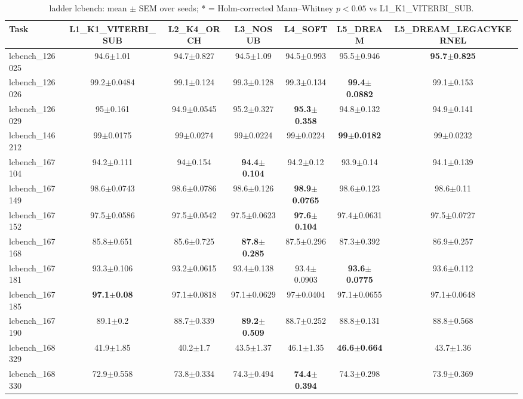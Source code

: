 \begin{table}[t]
\caption{ladder lcbench: mean $\pm$ SEM over seeds; * = Holm-corrected Mann--Whitney $p<0.05$ vs L1_K1_VITERBI_SUB.}
\label{tab:ladder_lcbench}
\begin{center}\small
\begin{tabular}{lcccccc}
\hline
Task & L1\_K1\_VITERBI\_SUB & L2\_K4\_ORCH & L3\_NOSUB & L4\_SOFT & L5\_DREAM & L5\_DREAM\_LEGACYKERNEL \\
\hline
lcbench\_126025 & 94.6$\pm$1.01 & 94.7$\pm$0.827 & 94.5$\pm$1.09 & 94.5$\pm$0.993 & 95.5$\pm$0.946 & \textbf{95.7$\pm$0.825} \\
lcbench\_126026 & 99.2$\pm$0.0484 & 99.1$\pm$0.124 & 99.3$\pm$0.128 & 99.3$\pm$0.134 & \textbf{99.4$\pm$0.0882} & 99.1$\pm$0.153 \\
lcbench\_126029 & 95$\pm$0.161 & 94.9$\pm$0.0545 & 95.2$\pm$0.327 & \textbf{95.3$\pm$0.358} & 94.8$\pm$0.132 & 94.9$\pm$0.141 \\
lcbench\_146212 & 99$\pm$0.0175 & 99$\pm$0.0274 & 99$\pm$0.0224 & 99$\pm$0.0224 & \textbf{99$\pm$0.0182} & 99$\pm$0.0232 \\
lcbench\_167104 & 94.2$\pm$0.111 & 94$\pm$0.154 & \textbf{94.4$\pm$0.104} & 94.2$\pm$0.12 & 93.9$\pm$0.14 & 94.1$\pm$0.139 \\
lcbench\_167149 & 98.6$\pm$0.0743 & 98.6$\pm$0.0786 & 98.6$\pm$0.126 & \textbf{98.9$\pm$0.0765} & 98.6$\pm$0.123 & 98.6$\pm$0.11 \\
lcbench\_167152 & 97.5$\pm$0.0586 & 97.5$\pm$0.0542 & 97.5$\pm$0.0623 & \textbf{97.6$\pm$0.104} & 97.4$\pm$0.0631 & 97.5$\pm$0.0727 \\
lcbench\_167168 & 85.8$\pm$0.651 & 85.6$\pm$0.725 & \textbf{87.8$\pm$0.285} & 87.5$\pm$0.296 & 87.3$\pm$0.392 & 86.9$\pm$0.257 \\
lcbench\_167181 & 93.3$\pm$0.106 & 93.2$\pm$0.0615 & 93.4$\pm$0.138 & 93.4$\pm$0.0903 & \textbf{93.6$\pm$0.0775} & 93.6$\pm$0.112 \\
lcbench\_167185 & \textbf{97.1$\pm$0.08} & 97.1$\pm$0.0818 & 97.1$\pm$0.0629 & 97$\pm$0.0404 & 97.1$\pm$0.0655 & 97.1$\pm$0.0648 \\
lcbench\_167190 & 89.1$\pm$0.2 & 88.7$\pm$0.339 & \textbf{89.2$\pm$0.509} & 88.7$\pm$0.252 & 88.8$\pm$0.131 & 88.8$\pm$0.568 \\
lcbench\_168329 & 41.9$\pm$1.85 & 40.2$\pm$1.7 & 43.5$\pm$1.37 & 46.1$\pm$1.35 & \textbf{46.6$\pm$0.664} & 43.7$\pm$1.36 \\
lcbench\_168330 & 72.9$\pm$0.558 & 73.8$\pm$0.334 & 74.3$\pm$0.494 & \textbf{74.4$\pm$0.394} & 74.3$\pm$0.298 & 73.9$\pm$0.369 \\

\end{tabular}
\end{center}
\end{table}
